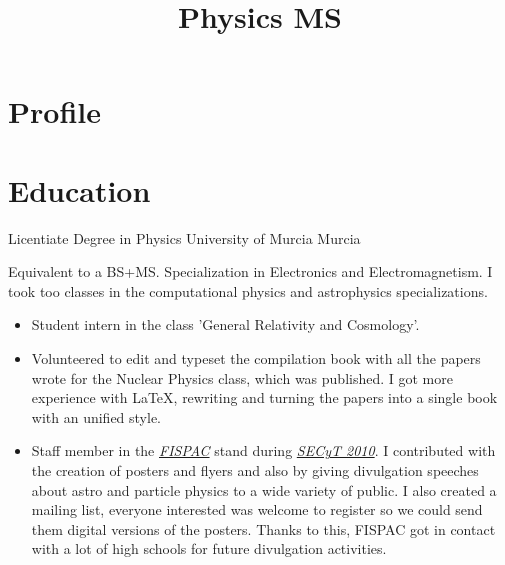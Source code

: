 \documentclass[11pt,a4paper,roman]{moderncv}
\title{Physics MS}
\begin{document}
\maketitle



\section{Profile}

\section{Education}

	{Licentiate Degree in Physics}
	{University of Murcia}
	{Murcia}
	{}
	{Equivalent to a BS+MS. Specialization in Electronics and Electromagnetism.
	 I took too classes in the computational physics and astrophysics 
	 specializations.
	\begin{itemize}
		\item Student intern in the class 'General Relativity and Cosmology'.
		\item Volunteered to edit and typeset the compilation book with all the 
		papers wrote for the Nuclear Physics class, which was published. I got 
		more experience with \LaTeX, rewriting and turning the 
		papers into a single book with an unified style.
		\item Staff member in the \textit{\href{http://www.um.es/fispac/}
		{FISPAC}} stand during \textit{\href{http://www.f-
		seneca.org/secyt10/home.php}{SECyT 2010}}. I contributed with the creation 
		of posters and flyers and also by giving divulgation speeches about astro 
		and particle physics to a wide variety of public. I also created a mailing 
		list, everyone interested was welcome to register so we could send them 
		digital versions of the posters. Thanks to this, FISPAC got in contact with 
		a lot of high schools for future divulgation activities.
	\end{itemize}	
	}
\end{document}
